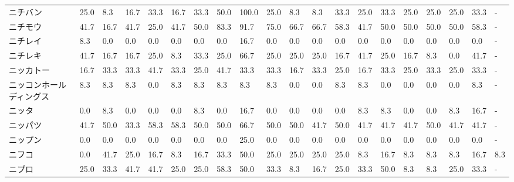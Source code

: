\documentclass[a4paper，11pt]{jsarticle}
\begin{document}
\begin{longtable}[c]{lp{3mm}p{3mm}p{3mm}p{3mm}p{3mm}p{3mm}p{3mm}p{3mm}p{3mm}p{3mm}p{3mm}p{3mm}p{3mm}p{3mm}p{3mm}p{3mm}p{3mm}p{3mm}p{3mm}}
ニチバン            &   25.0 &    8.3 &      16.7 &      33.3 &       16.7 &   33.3 &   50.0 &  100.0 &    25.0 &     8.3 &    8.3 &  33.3 &   25.0 &    33.3 &    25.0 &  25.0 &  25.0 &  33.3 &     - \\
ニチモウ            &   41.7 &   16.7 &      41.7 &      25.0 &       41.7 &   50.0 &   83.3 &   91.7 &    75.0 &    66.7 &   66.7 &  58.3 &   41.7 &    50.0 &    50.0 &  50.0 &  50.0 &  58.3 &     - \\
ニチレイ            &    8.3 &    0.0 &       0.0 &       0.0 &        0.0 &    0.0 &    0.0 &   16.7 &     0.0 &     0.0 &    0.0 &   0.0 &    0.0 &     0.0 &     0.0 &   0.0 &   0.0 &   0.0 &     - \\
ニチレキ            &   41.7 &   16.7 &      16.7 &      25.0 &        8.3 &   33.3 &   25.0 &   66.7 &    25.0 &    25.0 &   25.0 &  16.7 &   41.7 &    25.0 &    16.7 &   8.3 &   0.0 &  41.7 &     - \\
ニッカトー           &   16.7 &   33.3 &      33.3 &      41.7 &       33.3 &   25.0 &   41.7 &   33.3 &    33.3 &    16.7 &   33.3 &  25.0 &   16.7 &    33.3 &    25.0 &  33.3 &  25.0 &  33.3 &     - \\
ニッコンホールディングス    &    8.3 &    8.3 &       8.3 &       0.0 &        8.3 &    8.3 &    8.3 &    8.3 &     8.3 &     0.0 &    0.0 &   8.3 &    8.3 &     0.0 &     0.0 &   0.0 &   0.0 &   8.3 &     - \\
ニッタ             &    0.0 &    8.3 &       0.0 &       0.0 &        0.0 &    8.3 &    0.0 &   16.7 &     0.0 &     0.0 &    0.0 &   0.0 &    8.3 &     8.3 &     0.0 &   0.0 &   8.3 &  16.7 &     - \\
ニッパツ            &   41.7 &   50.0 &      33.3 &      58.3 &       58.3 &   50.0 &   50.0 &   66.7 &    50.0 &    50.0 &   41.7 &  50.0 &   41.7 &    41.7 &    41.7 &  50.0 &  41.7 &  41.7 &     - \\
ニップン            &    0.0 &    0.0 &       0.0 &       0.0 &        0.0 &    0.0 &    0.0 &   25.0 &     0.0 &     0.0 &    0.0 &   0.0 &    0.0 &     0.0 &     0.0 &   0.0 &   0.0 &   0.0 &     - \\
ニフコ             &    0.0 &   41.7 &      25.0 &      16.7 &        8.3 &   16.7 &   33.3 &   50.0 &    25.0 &    25.0 &   25.0 &  25.0 &    8.3 &    16.7 &     8.3 &   8.3 &   8.3 &  16.7 &   8.3 \\
ニプロ             &   25.0 &   33.3 &      41.7 &      41.7 &       25.0 &   25.0 &   58.3 &   50.0 &    33.3 &     8.3 &   16.7 &  25.0 &   33.3 &    50.0 &     8.3 &   8.3 &  25.0 &  33.3 &     - \\

\end{longtable}
\end{document}

